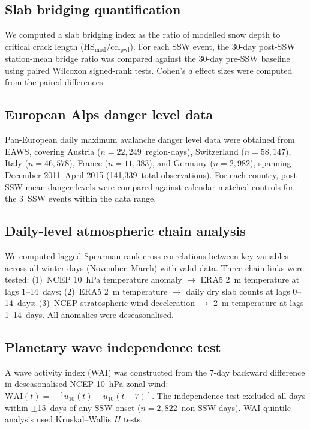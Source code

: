 \documentclass[11pt,a4paper]{article}
\begin{document}
\subsection{Slab bridging quantification}

We computed a slab bridging index as the ratio of modelled snow depth to critical crack length ($\mathrm{HS_{mod}} / \mathrm{ccl_{pwl}}$). For each SSW event, the 30-day post-SSW station-mean bridge ratio was compared against the 30-day pre-SSW baseline using paired Wilcoxon signed-rank tests. Cohen's $d$ effect sizes were computed from the paired differences.

\subsection{European Alps danger level data}

Pan-European daily maximum avalanche danger level data were obtained from EAWS, covering Austria ($n = 22{,}249$~region-days), Switzerland ($n = 58{,}147$), Italy ($n = 46{,}578$), France ($n = 11{,}383$), and Germany ($n = 2{,}982$), spanning December 2011--April 2015 (141{,}339~total observations). For each country, post-SSW mean danger levels were compared against calendar-matched controls for the 3~SSW events within the data range.

\subsection{Daily-level atmospheric chain analysis}

We computed lagged Spearman rank cross-correlations between key variables across all winter days (November--March) with valid data. Three chain links were tested: (1)~NCEP 10~hPa temperature anomaly $\to$ ERA5 2~m temperature at lags 1--14~days; (2)~ERA5 2~m temperature $\to$ daily dry slab counts at lags 0--14~days; (3)~NCEP stratospheric wind deceleration $\to$ 2~m temperature at lags 1--14~days. All anomalies were deseasonalised.

\subsection{Planetary wave independence test}

A wave activity index (WAI) was constructed from the 7-day backward difference in deseasonalised NCEP 10~hPa zonal wind: $\mathrm{WAI}(t) = -[\bar{u}_{10}(t) - \bar{u}_{10}(t{-}7)]$. The independence test excluded all days within $\pm$15~days of any SSW onset ($n = 2{,}822$~non-SSW days). WAI quintile analysis used Kruskal--Wallis $H$ tests.
\end{document}
